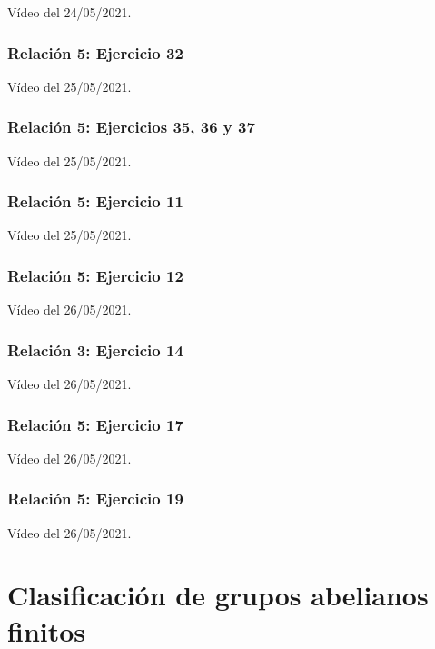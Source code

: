 \documentclass[11pt,a4paper]{article}
\begin{document}
Vídeo del 24/05/2021.


\subsubsection*{Relación 5: Ejercicio 32}

Vídeo del 25/05/2021.

\subsubsection*{Relación 5: Ejercicios 35, 36 y 37}

Vídeo del 25/05/2021.

\subsubsection*{Relación 5: Ejercicio 11}

Vídeo del 25/05/2021.


\subsubsection*{Relación 5: Ejercicio 12}

Vídeo del 26/05/2021.

\subsubsection*{Relación 3: Ejercicio 14}

Vídeo del 26/05/2021.

\subsubsection*{Relación 5: Ejercicio 17}

Vídeo del 26/05/2021.

\subsubsection*{Relación 5: Ejercicio 19}

Vídeo del 26/05/2021.

\newpage

\section{Clasificación de grupos abelianos finitos}
\end{document}
